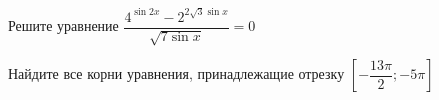 \begin{ex}
	\begin{condition}
		\begin{enumcols}[label=\asbuk*)]
			\item Решите уравнение \( \dfrac{4^{\sin 2x} - 2^{2\sqrt{3}\sin x}}{\sqrt{7\sin x}} = 0 \)
			\item Найдите все корни уравнения, принадлежащие отрезку \( \left[-\dfrac{13\pi}{2};-5\pi\right] \)
		\end{enumcols}
	\end{condition}
\end{ex}